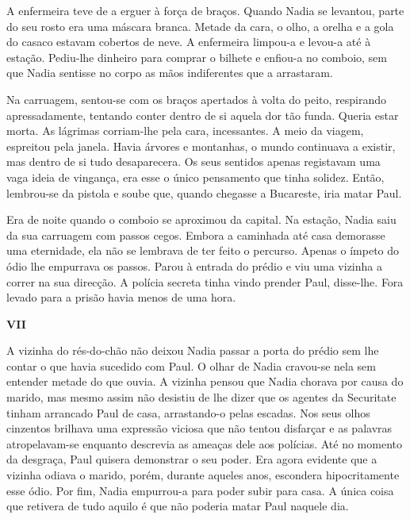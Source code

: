 A enfermeira teve de a erguer à força de braços. Quando Nadia se
levantou, parte do seu rosto era uma máscara branca. Metade da cara, o
olho, a orelha e a gola do casaco estavam cobertos de neve. A enfermeira
limpou-a e levou-a até à estação. Pediu-lhe dinheiro para comprar o
bilhete e enfiou-a no comboio, sem que Nadia sentisse no corpo as mãos
indiferentes que a arrastaram.

Na carruagem, sentou-se com os braços apertados à volta do peito,
respirando apressadamente, tentando conter dentro de si aquela dor tão
funda. Queria estar morta. As lágrimas corriam-lhe pela cara,
incessantes. A meio da viagem, espreitou pela janela. Havia árvores e
montanhas, o mundo continuava a existir, mas dentro de si tudo desaparecera. Os seus sentidos apenas registavam uma vaga ideia de vingança,
era esse o único pensamento que tinha solidez. Então, lembrou-se da
pistola e soube que, quando chegasse a Bucareste, iria matar Paul.

Era de noite quando o comboio se aproximou da capital. Na estação, Nadia
saiu da sua carruagem com passos cegos. Embora a caminhada até casa
demorasse uma eternidade, ela não se lembrava de ter feito o percurso.
Apenas o ímpeto do ódio lhe empurrava os passos. Parou à entrada do
prédio e viu uma vizinha a correr na sua direcção. A polícia secreta
tinha vindo prender Paul, disse-lhe. Fora levado para a prisão havia
menos de uma hora.

\pagebreak
\vspace*{1.8cm}
\noindent{}\textbf{VII}

\bigskip

A vizinha do rés-do-chão não deixou Nadia passar a porta do prédio sem
lhe contar o que havia sucedido com Paul. O olhar de Nadia cravou-se
nela sem entender metade do que ouvia. A vizinha pensou que Nadia
chorava por causa do marido, mas mesmo assim não desistiu de lhe dizer
que os agentes da Securitate tinham arrancado Paul de casa, arrastando-o
pelas escadas. Nos seus olhos cinzentos brilhava uma expressão viciosa
que não tentou disfarçar e as palavras atropelavam-se enquanto
descrevia as ameaças dele aos polícias. Até no momento da desgraça, Paul
quisera demonstrar o seu poder. Era agora evidente que a vizinha odiava
o marido, porém, durante aqueles anos, escondera hipocritamente esse
ódio. Por fim, Nadia empurrou-a para poder subir para casa. A única
coisa que retivera de tudo aquilo é que não poderia matar Paul naquele
dia.

